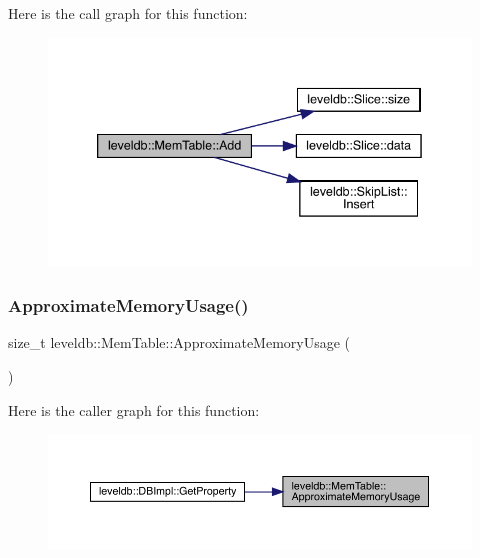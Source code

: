 Here is the call graph for this function\+:
\nopagebreak
\begin{figure}[H]
\begin{center}
\leavevmode
\includegraphics[width=339pt]{classleveldb_1_1_mem_table_a37bec80954badb2354426aa175e9371f_cgraph}
\end{center}
\end{figure}
\mbox{\label{classleveldb_1_1_mem_table_a667a1ada274201f0bdd3615baf1bd882}} 
\subsubsection{\texorpdfstring{ApproximateMemoryUsage()}{ApproximateMemoryUsage()}}
{\footnotesize\ttfamily size\+\_\+t leveldb\+::\+Mem\+Table\+::\+Approximate\+Memory\+Usage (\begin{DoxyParamCaption}{ }\end{DoxyParamCaption})}

Here is the caller graph for this function\+:
\nopagebreak
\begin{figure}[H]
\begin{center}
\leavevmode
\includegraphics[width=350pt]{classleveldb_1_1_mem_table_a667a1ada274201f0bdd3615baf1bd882_icgraph}
\end{center}
\end{figure}
\mbox{\label{classleveldb_1_1_mem_table_af94f80a5909a440d0675afa68f8765c5}} 
